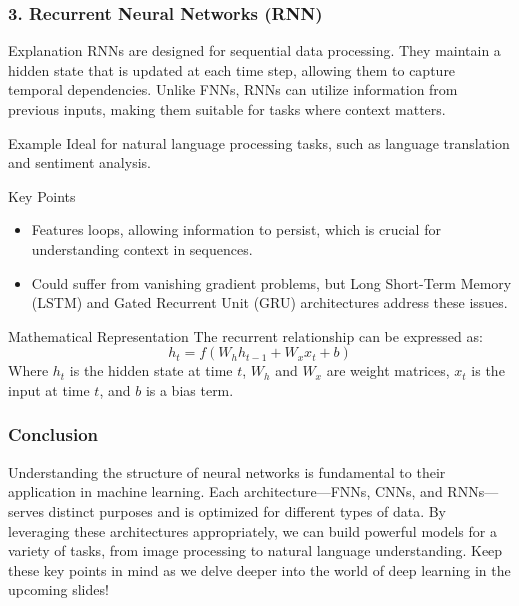 \documentclass[aspectratio=169]{beamer}
\begin{document}
\begin{frame}[fragile]
  \frametitle{3. Recurrent Neural Networks (RNN)}
  \begin{block}{Explanation}
    RNNs are designed for sequential data processing. They maintain a hidden state that is updated at each time step, allowing them to capture temporal dependencies. Unlike FNNs, RNNs can utilize information from previous inputs, making them suitable for tasks where context matters.
  \end{block}
  
  \begin{block}{Example}
    Ideal for natural language processing tasks, such as language translation and sentiment analysis.
  \end{block}
  
  \begin{block}{Key Points}
    \begin{itemize}
      \item Features loops, allowing information to persist, which is crucial for understanding context in sequences.
      \item Could suffer from vanishing gradient problems, but Long Short-Term Memory (LSTM) and Gated Recurrent Unit (GRU) architectures address these issues.
    \end{itemize}
  \end{block}

  \begin{block}{Mathematical Representation}
    The recurrent relationship can be expressed as:
    \begin{equation}
      h_t = f(W_hh_{t-1} + W_xx_t + b)
    \end{equation}
    Where \(h_t\) is the hidden state at time \(t\), \(W_h\) and \(W_x\) are weight matrices, \(x_t\) is the input at time \(t\), and \(b\) is a bias term.
  \end{block}
\end{frame}

\begin{frame}[fragile]
  \frametitle{Conclusion}
  Understanding the structure of neural networks is fundamental to their application in machine learning. Each architecture—FNNs, CNNs, and RNNs—serves distinct purposes and is optimized for different types of data. By leveraging these architectures appropriately, we can build powerful models for a variety of tasks, from image processing to natural language understanding. Keep these key points in mind as we delve deeper into the world of deep learning in the upcoming slides!
\end{frame}
\end{document}
